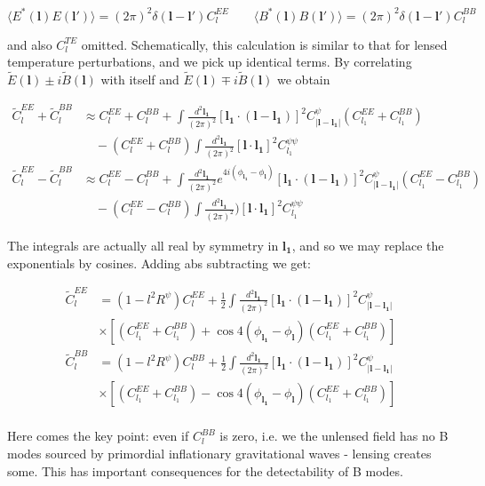 \documentclass[a4paper,10pt]{article}
\renewcommand{\v}[1]{\mathbf{#1}}
\newcommand{\half}{\frac{1}{2}}
\newcommand{\finttwo}[1]{\int \frac{d^2 \v{#1}}{(2\pi)^2}}
\begin{document}
\begin{equation}
\langle E^*(\v{l})E(\v{l}')\rangle = (2\pi)^2\delta(\v{l}-\v{l}')C_l^{EE} \qquad \langle B^*(\v{l})B(\v{l}')\rangle = (2\pi)^2\delta(\v{l}-\v{l}')C_l^{BB}
\end{equation}

and also $C_l^{TE}$ omitted. Schematically, this calculation is similar to that for lensed temperature perturbations, and we pick up identical terms. By correlating $\tilde{E}(\v{l})\pm i\tilde{B}(\v{l})$ with itself and $\tilde{E}(\v{l})\mp i\tilde{B}(\v{l})$ we obtain

\begin{equation}\begin{split}
\tilde{C}_l^{EE}+\tilde{C}_l^{BB} &\approx C_l^{EE}+C_l^{BB}+\finttwo{l_1}[ \v{l_1}\cdot(\v{l}-\v{l_1})]^2 C^\psi_{|\v{l}-\v{l_1}|}(C_{l_1}^{EE}+C_{l_1}^{BB}) \\
&\quad - (C_{l}^{EE}+C_{l}^{BB})\finttwo{l_1} [\v{l}\cdot\v{l_1}]^2C_{l_1}^{\psi\psi}\\
\tilde{C}_l^{EE}-\tilde{C}_l^{BB} &\approx C_l^{EE}-C_l^{BB}+\finttwo{l_1}e^{4i(\phi_{\v{l_1}}-\phi_\v{l})}[ \v{l_1}\cdot(\v{l}-\v{l_1})]^2 C^\psi_{|\v{l}-\v{l_1}|}(C_{l_1}^{EE}-C_{l_1}^{BB})\\
&\quad - (C_{l}^{EE}-C_{l}^{BB})\finttwo{l_1} )[\v{l}\cdot\v{l_1}]^2C_{l_1}^{\psi\psi}
\end{split}\end{equation}

The integrals are actually all real by symmetry in $\v{l_1}$, and so we may replace the exponentials by cosines. Adding abs subtracting we get:

\begin{equation}\begin{split}
\tilde{C}_l^{EE} &= (1-l^2R^\psi)C_l^{EE}+\half \finttwo{l_1}[ \v{l_1}\cdot(\v{l}-\v{l_1})]^2 C^\psi_{|\v{l}-\v{l_1}|}\\
& \times [(C_{l_1}^{EE}+C_{l_1}^{BB})+\cos{4(\phi_\v{l_1}-\phi_\v{l})}(C_{l_1}^{EE}+C_{l_1}^{BB})]\\
\tilde{C}_l^{BB} &= (1-l^2R^\psi)C_l^{BB}+\half \finttwo{l_1}[ \v{l_1}\cdot(\v{l}-\v{l_1})]^2 C^\psi_{|\v{l}-\v{l_1}|}\\
& \times [(C_{l_1}^{EE}+C_{l_1}^{BB})-\cos{4(\phi_\v{l_1}-\phi_\v{l})}(C_{l_1}^{EE}+C_{l_1}^{BB})]\\
\label{lensedBmodes}
\end{split}\end{equation}

Here comes the key point: even if $C_{l}^{BB}$ is zero, i.e. we the unlensed field has no B modes sourced by primordial inflationary gravitational waves - lensing creates some. This has important consequences for the detectability of B modes.\\
\end{document}
